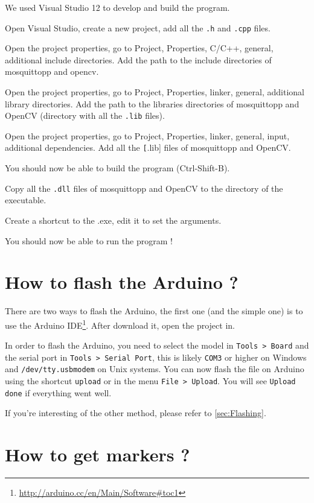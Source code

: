 \documentclass[a4paper,11pt]{report}
\begin{document}
We used Visual Studio 12 to develop and build the program.

Open Visual Studio, create a new project, add all the \texttt{.h} and
\texttt{.cpp} files.

Open the project properties, go to Project, Properties, C/C++, general,
additional include directories. Add the path to the include directories of
mosquittopp and opencv.

Open the project properties, go to Project, Properties, linker, general,
additional library directories. Add the path to the libraries directories of
mosquittopp and OpenCV (directory with all the \texttt{.lib} files).

Open the project properties, go to Project, Properties, linker, general, input,
additional dependencies. Add all the \texttt[.lib] files of mosquittopp and
OpenCV.

You should now be able to build the program (Ctrl-Shift-B).

Copy all the \texttt{.dll} files of mosquittopp and OpenCV to the directory of
the executable.

Create a shortcut to the .exe, edit it to set the arguments.

You should now be able to run the program !




\section{How to flash the Arduino ?}

There are two ways to flash the Arduino, the first one (and the simple one) is
to use the Arduino IDE\footnote{\url{http://arduino.cc/en/Main/Software\#toc1}}. After
download it, open the project in.

In order to flash the Arduino, you need to select the model in \texttt{Tools >
Board} and the serial port in \texttt{Tools > Serial Port}, this is likely
\texttt{COM3} or higher on Windows and \texttt{/dev/tty.usbmodem} on Unix systems.
You can now flash the file on Arduino using the shortcut \texttt{upload} or in
the menu \texttt{File > Upload}. You will see \texttt{Upload done} if everything
went well.

If you're interesting of the other method, please refer to \ref{sec:Flashing}.

\section{How to get markers ?}
\end{document}
